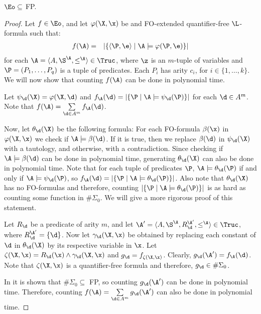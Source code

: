 \begin{theo}
$\Eo \subseteq$ {\sc FP}.
\end{theo}
\begin{proof}
Let $f \in \Eo$, and let $\varphi(\X,\x)$ be and {\sc FO}-extended quantifier-free $\L$-formula such that:
\begin{eqnarray*}
f(\A) &=& \vert \{\langle \P,\e  \rangle \mid \A \models \varphi(\P,\e) \} \vert
\end{eqnarray*}
for each $\A = \langle A, \S^{\A}, \leq^{\A} \rangle \in \Truc$, where $\z$ is an $m$-tuple of variables and $\P = (P_1,\ldots,P_q)$ is a tuple of predicates. Each $P_i$ has arity $c_i$, for $i \in \{1,\ldots,k\}$. We will now show that counting $f(\A)$ can be done in polynomial time.

Let $\psi_{\d}(\X) = \varphi(\X,\d)$ and $f_\A(\d) = \vert \{ \P \mid \A \models \psi_{\d}(\P) \} \vert$ for each $\d \in A^m$. Note that $f(\A) = \sum\limits_{\d\in A^m}f_\A(\d)$.

Now, let $\theta_{\d}(\X)$ be the following formula: For each {\sc FO}-formula $\beta(\x)$ in $\varphi(\X,\x)$ we check if $\A \models \beta(\d)$. If it is true, then we replace $\beta(\d)$ in $\psi_{\d}(\X)$ with a tautology, and otherwise, with a contradiction. Since checking if $\A \models \beta(\d)$ can be done in polynomial time, generating $\theta_{\d}(\X)$ can also be done in polynomial time. Note that for each tuple of predicates $\P$, $\A\models\theta_{\d}(\P)$ if and only if $\A\models\psi_{\d}(\P)$, so $f_\A(\d) = \vert \{ \P \mid \A\models \theta_{\d}(\P) \} \vert$. Also note that $\theta_{\d}(\X)$ has no {\sc FO}-formulas and therefore, counting $\vert \{ \P \mid \A \models \theta_{\d}(\P) \} \vert$ is as hard as counting some function in $\#\Sigma_0$. We will give a more rigorous proof of this statement.

Let $R_{\d}$ be a predicate of arity $m$, and let $\A^\prime = \langle A, \S^{\A}, R_{\d}^{\A^\prime}, \leq^{\A} \rangle \in \Truc$, where $R_{\d}^{\A^\prime} = \{\d\}$. Now let $\gamma_{\d}(\X,\x)$ be obtained by replacing each constant of $\d$ in $\theta_{\d}(\X)$ by its respective variable in $\x$. Let $\zeta(\X,\x) = R_{\d}(\x) \wedge \gamma_{\d}(\X,\x)$ and $g_{\d} = f_{\zeta(\X,\x)}$. Clearly, $g_{\d}(\A^\prime) = f_\A(\d)$. Note that $\zeta(\X,\x)$ is a quantifier-free formula and therefore, $g_{\d} \in \#\Sigma_0$. 

In \cite{DBLP:journals/jcss/SalujaST95} it is shown that $\#\Sigma_0 \subseteq$ {\sc FP}, so counting $g_{\d}(\A^\prime)$ can be done in polynomial time. Therefore, counting $f(\A) = \sum\limits_{\d\in A^m}g_{\d}(\A^\prime)$ can also be done in polynomial time.
\end{proof}
